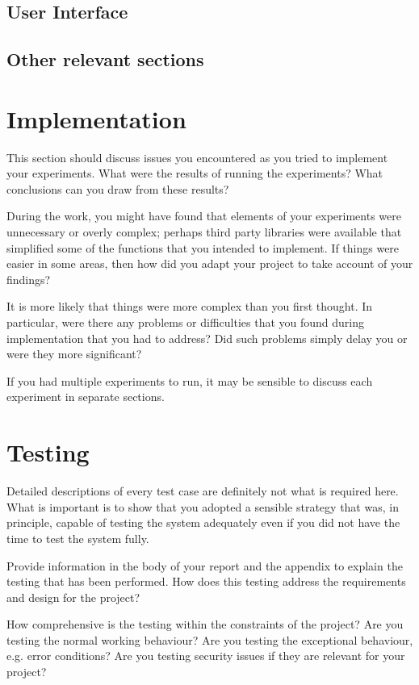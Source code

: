 \subsection{User Interface}

\subsection{Other relevant sections}

\section{Implementation}

This section should discuss issues you encountered as you tried to implement your experiments. What were the results of running the experiments? What conclusions can you draw from these results? 

During the work, you might have found that elements of your experiments were unnecessary or overly complex; perhaps third party libraries were available that simplified some of the functions that you intended to implement. If things were easier in some areas, then how did you adapt your project to take account of your findings?

It is more likely that things were more complex than you first thought. In particular, were there any problems or difficulties that you found during implementation that you had to address? Did such problems simply delay you or were they more significant? 

If you had multiple experiments to run, it may be sensible to discuss each experiment in separate sections. 

\section{Testing}
Detailed descriptions of every test case are definitely not what is required here. What is important is to show that you adopted a sensible strategy that was, in principle, capable of testing the system adequately even if you did not have the time to test the system fully.

Provide information in the body of your report and the appendix to explain the testing that has been performed. How does this testing address the requirements and design for the project?

How comprehensive is the testing within the constraints of the project?  Are you testing the normal working behaviour? Are you testing the exceptional behaviour, e.g. error conditions? Are you testing security issues if they are relevant for your project? 


